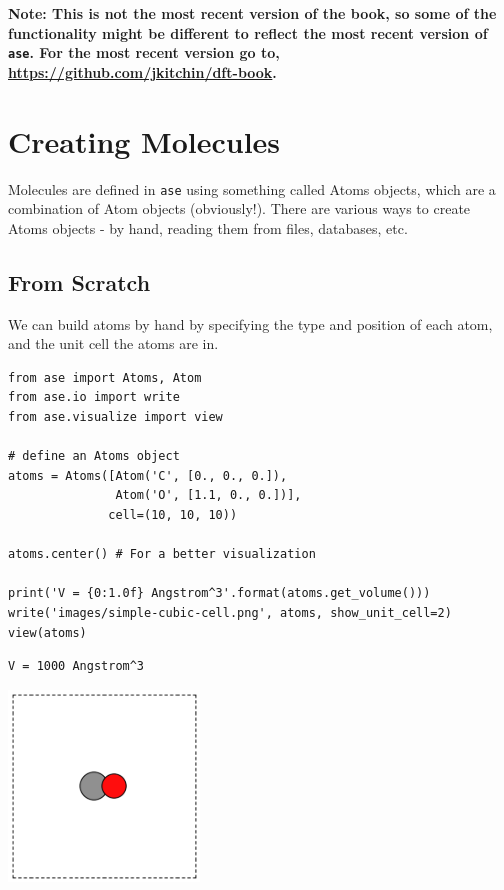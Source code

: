 \documentclass[11pt]{article}
\begin{document}
\textbf{Note: This is not the most recent version of the book, so some of the functionality might be different to reflect the most recent version of \texttt{ase}. For the most recent version go to, \url{https://github.com/jkitchin/dft-book}.}


\section{Creating Molecules}
\label{sec-4}

Molecules are defined in \texttt{ase} using something called Atoms objects, which are a combination of Atom objects (obviously!). There are various ways to create Atoms objects - by hand, reading them from files, databases, etc.

\subsection{From Scratch}
\label{sec-4-1}

We can build atoms by hand by specifying the type and position of each atom, and the unit cell the atoms are in.

\begin{verbatim}
from ase import Atoms, Atom
from ase.io import write
from ase.visualize import view

# define an Atoms object
atoms = Atoms([Atom('C', [0., 0., 0.]),
               Atom('O', [1.1, 0., 0.])],
              cell=(10, 10, 10))

atoms.center() # For a better visualization

print('V = {0:1.0f} Angstrom^3'.format(atoms.get_volume()))
write('images/simple-cubic-cell.png', atoms, show_unit_cell=2)
view(atoms)
\end{verbatim}

\begin{verbatim}
V = 1000 Angstrom^3
\end{verbatim}

\includegraphics[width=2in]{./images/simple-cubic-cell.png}
\end{document}
